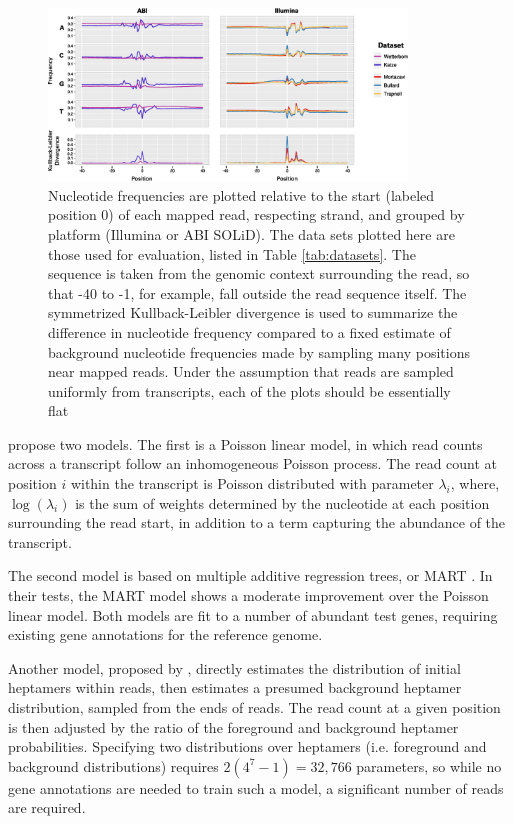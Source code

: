 \documentclass{bioinfo}
\begin{document}
\begin{figure}
\centerline{\includegraphics[width=0.85\textwidth]{freqs.eps}}
\caption{Nucleotide frequencies are plotted relative to the start (labeled
position 0) of each mapped read, respecting strand, and grouped by platform
(Illumina or ABI SOLiD).  The data sets plotted here are those used
for evaluation, listed in Table \ref{tab:datasets}.
The sequence is taken from the genomic context surrounding the read, so that -40
to -1, for example, fall outside the read sequence itself. The symmetrized
Kullback-Leibler divergence is used to summarize the difference in nucleotide
frequency compared to a fixed estimate of background nucleotide frequencies made
by sampling many positions near mapped reads.  Under the assumption that reads
are sampled uniformly from transcripts, each of the plots should be essentially
flat}
\label{fig:freqs}
\end{figure}

\citet{Li2010} propose two models. The first is a Poisson linear
model, in which read counts across a transcript follow an inhomogeneous Poisson
process. The read count at position $i$ within the transcript is Poisson
distributed with parameter $\lambda_i$, where, $\log(\lambda_i)$ is the sum of
weights determined by the nucleotide at each position surrounding the read
start, in addition to a term capturing the abundance of the transcript.

The second model is based on multiple additive regression trees, or MART
\citep{Friedman2003}.  In their tests, the MART model shows a moderate
improvement over the Poisson linear model. Both models are fit to a number of
abundant test genes, requiring existing gene annotations for the reference
genome. 

Another model, proposed by \citet{Hansen2010}, directly estimates the
distribution of initial heptamers within reads, then estimates a presumed
background heptamer distribution, sampled from the ends of reads. The read count
at a given position is then adjusted by the ratio of the foreground and
background heptamer probabilities. Specifying two distributions over heptamers
(i.e. foreground and background distributions) requires \mbox{$2(4^7-1) =
32,766$}
parameters, so while no gene annotations are needed to train such a model, a
significant number of reads are required.
\end{document}
